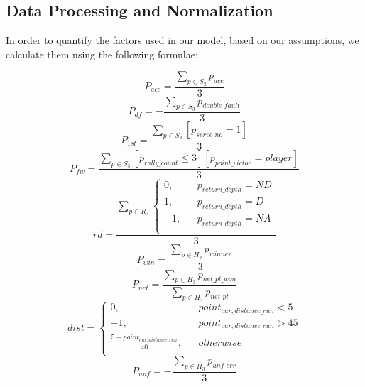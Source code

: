 \subsection{Data Processing and Normalization}
In order to quantify the factors used in our model, based on our assumptions, we calculate them using the following formulae: \par
\begin{equation}
    P_{ace} = \frac{\sum_{p \in S_3} p_{ace}}{3}
\end{equation}
\begin{equation}
    P_{df} = -\frac{\sum_{p \in S_3} p_{double\_fault}}{3}
\end{equation}
\begin{equation}
    P_{1st} = \frac{\sum_{p \in S_3} [p_{serve\_no} = 1]}{3}
\end{equation}
\begin{equation}
    P_{fw} = \frac{\sum_{p \in S_3} [p_{rally\_count} \le 3] [p_{point\_victor} = player]}{3}
\end{equation}
\begin{equation}
    rd = \frac{\sum_{p \in R_3} \left\{
        \begin{aligned}
        0, && p_{return\_depth} = ND \\
        1, && p_{return\_depth} = D \\
        -1, && p_{return\_depth} = NA \\
        \end{aligned}
        \right.}{3}
\end{equation}
\begin{equation}
    P_{win} = \frac{\sum_{p \in H_3} p_{winner}}{3}
\end{equation}
\begin{equation}
    P_{net} = \frac{\sum_{p \in H_3} p_{net\_pt\_won}}{\sum_{p \in H_3} p_{net\_pt}}
\end{equation}
\begin{equation}
    dist = \left\{
        \begin{aligned}
        0, && point_{cur, distance\_run} < 5 \\
        -1, && point_{cur, distance\_run} > 45 \\
        \frac{5 - point_{cur, distance\_run}}{40}, && otherwise \\
        \end{aligned}
        \right.
\end{equation}
\begin{equation}
    P_{unf} = -\frac{\sum_{p \in H_3} p_{unf\_err}}{3}
\end{equation}
